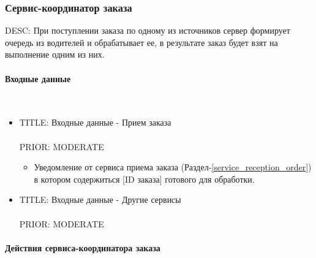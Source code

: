 \subsubsection{Сервис-координатор заказа} \label{selection_drivers_for_the_order}

    DESC:  При поступлении заказа по одному из источников сервер формирует очередь из водителей и обрабатывает ее, в результате заказ будет взят на выполнение одним из них. 

    \paragraph{Входные данные} \mbox{} \\ \label{}

	  \begin{itemize}

	    \item{

	      TITLE: Входные данные - Прием заказа\\
	      \\
	      PRIOR: MODERATE\\

	    }

		    \begin{itemize}
		      \item Уведомление от сервиса приема заказа (Раздел-\ref{service_reception_order}) в котором содержиться [ID заказа] готового для обработки.
		    \end{itemize}

	    \item{

	      TITLE: Входные данные - Другие сервисы\\
	      \\
	      PRIOR: MODERATE\\

	    }

	  \end{itemize}

	\paragraph{Действия сервиса-координатора заказа} \mbox{} \\ \label{}

